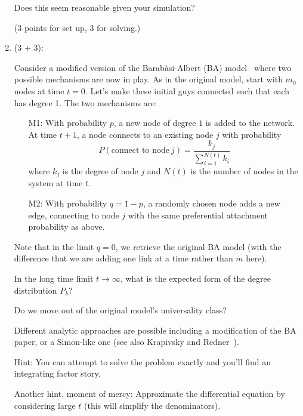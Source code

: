 \begin{enumerate}
  Does this seem reasonable given your simulation?

  (3 points for set up, 3 for solving.)

  
   \solutionstart


   \solutionend

\item (3 + 3):

  Consider a modified version
  of the Barab\`{a}si-Albert (BA) model~\cite{barabasi1999a}
  where two possible mechanisms
  are now in play.  As in the original
  model, start with $m_{0}$ nodes at time $t=0$.
  Let's make these initial guys connected such that each
  has degree 1.  The two mechanisms are:
  \begin{enumerate}
  \item[M1:] With probability $p$, 
    a new node of degree $1$ is added to
    the network.  
    At time $t+1$, a node connects to an existing
    node $j$ with probability 
    \begin{equation}
      P(\mbox{connect to node}\ j) = \frac{k_{j}}{\sum_{i=1}^{N(t)} k_{i}}
      \label{300as1.eq:Pconnectj}
    \end{equation}
    where $k_{j}$ is the degree of node $j$ and
    $N(t)$ is the number of nodes in the system at time $t$.
  \item[M2:] With probability $q=1-p$, 
    a randomly chosen node adds a new edge,
    connecting to node $j$ with
    the same preferential attachment
    probability as above.
  \end{enumerate}
  Note that in the limit $q=0$, we retrieve the original BA model
  (with the difference that we are adding one link at a time
  rather than $m$ here).

  In the long time limit $t \rightarrow \infty$,
  what is the expected form of the degree distribution $P_{k}$?

  Do we move out of the original model's universality class?

  Different analytic approaches are possible including
  a modification of the BA paper, or a Simon-like one
  (see also Krapivsky and Redner~\cite{krapivsky2001a}).

  Hint: You can attempt to solve the problem exactly
  and you'll find an integrating factor story.

  Another hint, moment of mercy: Approximate 
  the differential equation by considering
  large $t$ (this will simplify the denominators).


\end{enumerate}
